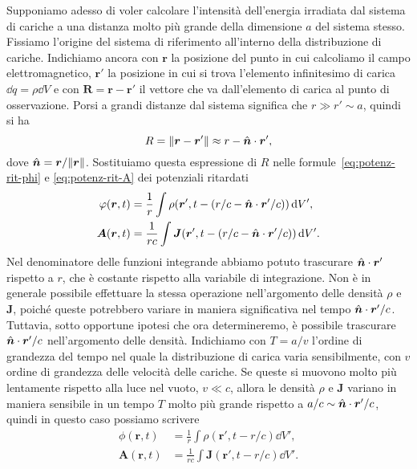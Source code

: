 Supponiamo adesso di voler calcolare l'intensità dell'energia irradiata dal
sistema di cariche a una distanza molto più grande della dimensione $a$ del
sistema stesso.  Fissiamo l'origine del sistema di riferimento all'interno della
distribuzione di cariche.  Indichiamo ancora con $\bm{r}$ la posizione del punto
in cui calcoliamo il campo elettromagnetico, $\bm{r}'$ la posizione in cui si
trova l'elemento infinitesimo di carica $\dd q = \rho\dd V$ e con
$\bm{R} = \bm{r} - \bm{r}'$ il vettore che va dall'elemento di carica al punto
di osservazione.  Porsi a grandi distanze dal sistema significa che
$r \gg r' \sim a$, quindi si ha
\begin{equation}
  R = \lVert\bm{r} - \bm{r}'\rVert \approx r - \hat{\bm{n}}\cdot\bm{r}',
\end{equation}
dove $\hat{\bm{n}} = \bm{r}/\lVert\bm{r}\rVert$.  Sostituiamo questa espressione di $R$
nelle formule~\eqref{eq:potenz-rit-phi} e \eqref{eq:potenz-rit-A} dei potenziali
ritardati
\begin{subequations}
  \label{eq:potenz-em-distanti}
  \begin{align}
    \varphi (\bm{r}, t) &= \frac{1}{r} \int \rho(\bm{r}', t - (r/c -
    \hat{\bm{n}}\cdot\bm{r}'/c)) \mathop{}\!\mathrm{d} V', \\
    \bm{A}(\bm{r}, t) &= \frac{1}{rc} \int \bm{J}(\bm{r}', t - (r/c -
    \hat{\bm{n}}\cdot\bm{r}'/c)) \mathop{}\!\mathrm{d} V'.
  \end{align}
\end{subequations}
Nel denominatore delle funzioni integrande abbiamo potuto trascurare
$\hat{\bm{n}}\cdot\bm{r}'$ rispetto a $r$, che è costante rispetto alla variabile
di integrazione.  Non è in generale possibile effettuare la stessa operazione
nell'argomento delle densità $\rho$ e $\bm{J}$, poiché queste potrebbero variare
in maniera significativa nel tempo $\hat{\bm{n}}\cdot\bm{r}'/c$.  Tuttavia, sotto
opportune ipotesi che ora determineremo, è possibile trascurare
$\hat{\bm{n}}\cdot\bm{r}'/c$ nell'argomento delle densità.  Indichiamo con
$T = a/v$ l'ordine di grandezza del tempo nel quale la distribuzione di carica
varia sensibilmente, con $v$ ordine di grandezza delle velocità delle cariche.
Se queste si muovono molto più lentamente rispetto alla luce nel vuoto,
$v \ll c$, allora le densità $\rho$ e $\bm{J}$ variano in maniera sensibile in
un tempo $T$ molto più grande rispetto a $a/c \sim \hat{\bm{n}}\cdot\bm{r}'/c$,
quindi in questo caso possiamo scrivere
\begin{subequations}
  \begin{align}
    \phi (\bm{r}, t) &= \frac{1}{r} \int \rho(\bm{r}', t - r/c) \dd V', \\
    \bm{A}(\bm{r}, t) &= \frac{1}{rc} \int \bm{J}(\bm{r}', t - r/c) \dd V'.
  \end{align}
\end{subequations}
